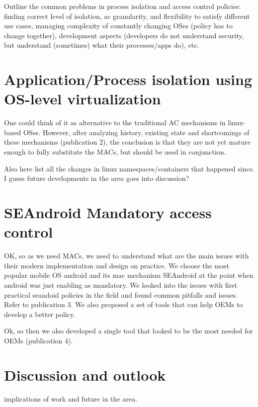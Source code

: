 Outline the common problems in process isolation and access control policies: finding correct level of isolation, ac granularity, and flexibility to satisfy different use cases, managing complexity of constantly changing OSes (policy has to change together), development aspects (developers do not understand security, but understand (sometimes) what their processes/apps do), etc. 



\section{Application/Process isolation using OS-level virtualization}

One could think of it as alternative to the traditional AC mechanisms in linux-based OSes. 
However, after analyzing history, existing state and shortcomings of these mechanisms (publication 2), the conclusion is that they are
not yet mature enough to fully substitute the MACs, but should be used in conjunction. 

Also here list all the changes in linux namespaces/containers that happened since. I guess future developments in the area goes into discussion? 

\section{SEAndroid Mandatory access control}

OK, so as we need MACs, we need to understand what are the main issues with their modern implementation and design on practice. 
We choose the most popular mobile OS android and its mac mechanism SEAndroid at the point when android was just enabling as mandatory. 
We looked into the issues with first practical seandoid policies in the field and found common pitfalls and issues. Refer to publication 3.
We also proposed a set of tools that can help OEMs to develop a better policy. 

Ok, so then we also developed a single tool that looked to be the most needed for OEMs (publication 4).  


\section{Discussion and outlook}
implications of work and future in the area. 
